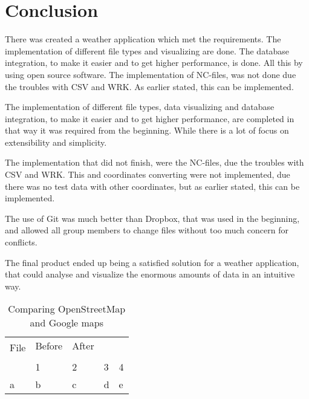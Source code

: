 \chapter{Conclusion}
There was created a weather application which met the requirements.
The implementation of different file types and visualizing are done. The database integration, to make it easier and to get higher performance, is done. All this by using open source software.
The implementation of NC-files, was not done due the troubles with CSV and WRK. As earlier stated, this can be implemented.

The implementation of different file types, data visualizing and database integration, to make it easier and to get higher performance, are completed in that way it was required from the beginning. While there is a lot of focus on extensibility and simplicity.
 
The implementation that did not finish, were the NC-files, due the troubles with CSV and WRK. This and coordinates converting were not implemented, due there was no test data with other coordinates, but as earlier stated, this can be implemented.

The use of Git was much better than Dropbox, that was used in the beginning, and allowed all group members to change files without too much concern for conflicts.

The final product ended up being a satisfied solution for a weather application, that could analyse and visualize the enormous amounts of data in an intuitive way.

\begin{table}[htbp]
\centering
\begin{tabular}{| l | l | l | l | l |}
\hline
\multirow{2}{*}{File} & Before & After \\ & & \\ \hline
 & 1 & 2 & 3 & 4 \\ \hline
a & b & c & d & e
\hline
\end{tabular}
\caption{Comparing OpenStreetMap and Google maps}
\label{tab:osm_vs_google}
\end{table}
